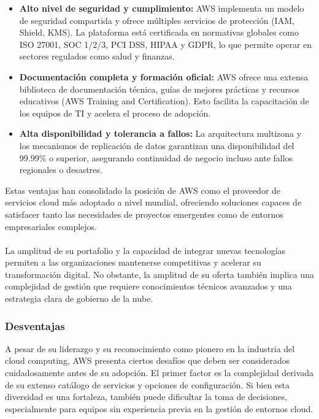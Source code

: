 {\begin{itemize}
                    \item \textbf{Alto nivel de seguridad y cumplimiento:} AWS implementa un modelo de seguridad compartida y ofrece múltiples servicios de protección (IAM, Shield, KMS). La plataforma está certificada en normativas globales como ISO 27001, SOC 1/2/3, PCI DSS, HIPAA y GDPR, lo que permite operar en sectores regulados como salud y finanzas.
                    \item \textbf{Documentación completa y formación oficial:} AWS ofrece una extensa biblioteca de documentación técnica, guías de mejores prácticas y recursos educativos (AWS Training and Certification). Esto facilita la capacitación de los equipos de TI y acelera el proceso de adopción.
                    \item \textbf{Alta disponibilidad y tolerancia a fallos:} La arquitectura multizona y los mecanismos de replicación de datos garantizan una disponibilidad del 99.99\% o superior, asegurando continuidad de negocio incluso ante fallos regionales o desastres.
                \end{itemize}

                Estas ventajas han consolidado la posición de AWS como el proveedor de servicios cloud más adoptado a nivel mundial, ofreciendo soluciones capaces de satisfacer tanto las necesidades de proyectos emergentes como de entornos empresariales complejos.
                
                \paragraph{}La amplitud de su portafolio y la capacidad de integrar nuevas tecnologías permiten a las organizaciones mantenerse competitivas y acelerar su transformación digital. No obstante, la amplitud de su oferta también implica una complejidad de gestión que requiere conocimientos técnicos avanzados y una estrategia clara de gobierno de la nube.
                
            \subsubsection{Desventajas}
                A pesar de su liderazgo y su reconocimiento como pionero en la industria del cloud computing, AWS presenta ciertos desafíos que deben ser considerados cuidadosamente antes de su adopción. El primer factor es la complejidad derivada de su extenso catálogo de servicios y opciones de configuración. Si bien esta diversidad es una fortaleza, también puede dificultar la toma de decisiones, especialmente para equipos sin experiencia previa en la gestión de entornos cloud.

}
